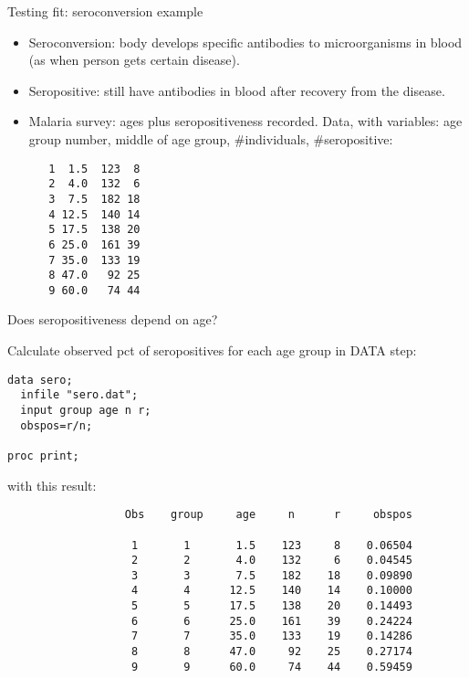 \documentclass[pdf]{prosper}
\begin{document}
\begin{slide}{Testing fit: seroconversion example}

  \begin{itemize}
  \item Seroconversion: body develops specific
    antibodies to microorganisms in blood (as when person gets
    certain disease). 
    \item Seropositive: still
    have antibodies in blood after recovery from
    the disease. 
    \item Malaria survey: ages plus seropositiveness recorded. Data, with variables: age group number, middle of age
    group, \#individuals, \#seropositive:
{\scriptsize
\begin{verbatim}
   1  1.5  123  8
   2  4.0  132  6
   3  7.5  182 18
   4 12.5  140 14
   5 17.5  138 20
   6 25.0  161 39
   7 35.0  133 19
   8 47.0   92 25
   9 60.0   74 44

\end{verbatim}
}
  \end{itemize}
  
\end{slide}

\begin{slide}{Does seropositiveness depend on age?}

Calculate observed pct of seropositives for each age group in DATA step:

\begin{verbatim}
data sero;
  infile "sero.dat";
  input group age n r;
  obspos=r/n;

proc print;
\end{verbatim}

with this result:

{\scriptsize
\begin{verbatim}
                  Obs    group     age     n      r     obspos

                   1       1       1.5    123     8    0.06504
                   2       2       4.0    132     6    0.04545
                   3       3       7.5    182    18    0.09890
                   4       4      12.5    140    14    0.10000
                   5       5      17.5    138    20    0.14493
                   6       6      25.0    161    39    0.24224
                   7       7      35.0    133    19    0.14286
                   8       8      47.0     92    25    0.27174
                   9       9      60.0     74    44    0.59459
\end{verbatim}
}
  
\end{slide}
\end{document}

